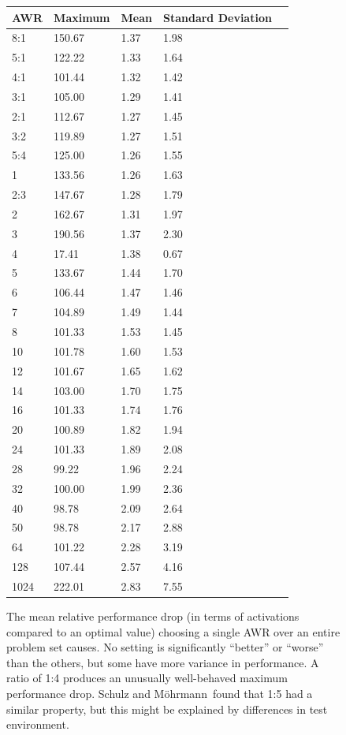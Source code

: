 \documentclass{llncs}
\newcommand{\sandm}{Schulz and M{\"{o}}hrmann}
\begin{document}
\begin{figure}[t]
	\centering
	\begin{tabular}{l l l l l}
AWR & Maximum & Mean & Standard Deviation\\
\hline
8:1 & 150.67 & 1.37 & 1.98\\
5:1 & 122.22 & 1.33 & 1.64\\
4:1 & 101.44 & 1.32 & 1.42\\
3:1 & 105.00 & 1.29 & 1.41\\
2:1 & 112.67 & 1.27 & 1.45\\
3:2 & 119.89 & 1.27 & 1.51\\
5:4 & 125.00 & 1.26 & 1.55\\
1 & 133.56 & 1.26 & 1.63\\
2:3 & 147.67 & 1.28 & 1.79\\
2 & 162.67 & 1.31 & 1.97\\
3 & 190.56 & 1.37 & 2.30\\
4 & 17.41 & 1.38 & 0.67\\
5 & 133.67 & 1.44 & 1.70\\
6 & 106.44 & 1.47 & 1.46\\
7 & 104.89 & 1.49 & 1.44\\
8 & 101.33 & 1.53 & 1.45\\
10 & 101.78 & 1.60 & 1.53\\
12 & 101.67 & 1.65 & 1.62\\
14 & 103.00 & 1.70 & 1.75\\
16 & 101.33 & 1.74 & 1.76\\
20 & 100.89 & 1.82 & 1.94\\
24 & 101.33 & 1.89 & 2.08\\
28 & 99.22 & 1.96 & 2.24\\
32 & 100.00 & 1.99 & 2.36\\
40 & 98.78 & 2.09 & 2.64\\
50 & 98.78 & 2.17 & 2.88\\
64 & 101.22 & 2.28 & 3.19\\
128 & 107.44 & 2.57 & 4.16\\
1024 & 222.01 & 2.83 & 7.55
	\end{tabular}
	\caption{The mean relative performance drop (in terms of activations compared to an optimal value) choosing a single AWR over an entire problem set causes. No setting is significantly ``better'' or ``worse'' than the others, but some have more variance in performance. A ratio of 1:4 produces an unusually well-behaved maximum performance drop. \sandm~found that 1:5 had a similar property, but this might be explained by differences in test environment.}
	\label{fig:no-best-awr}
\end{figure}
\end{document}
